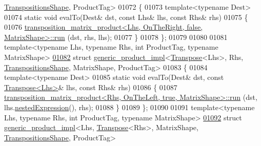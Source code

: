 \begin{DoxyCode}
      \hyperlink{struct_eigen_1_1_transpositions_shape}{TranspositionsShape}, ProductTag>
01072 \{
01073   \textcolor{keyword}{template}<\textcolor{keyword}{typename} Dest>
01074   \textcolor{keyword}{static} \textcolor{keywordtype}{void} evalTo(Dest& dst, \textcolor{keyword}{const} Lhs& lhs, \textcolor{keyword}{const} Rhs& rhs)
01075   \{
01076     \hyperlink{struct_eigen_1_1internal_1_1transposition__matrix__product}{transposition\_matrix\_product<Lhs, OnTheRight, false, MatrixShape>::run}
      (dst, rhs, lhs);
01077   \}
01078 \};
01079 
01080 
01081 \textcolor{keyword}{template}<\textcolor{keyword}{typename} Lhs, \textcolor{keyword}{typename} Rhs, \textcolor{keywordtype}{int} ProductTag, \textcolor{keyword}{typename} MatrixShape>
\hyperlink{struct_eigen_1_1internal_1_1generic__product__impl_3_01_transpose_3_01_lhs_01_4_00_01_rhs_00_01_287c8e613c7656c0ce6593799fd7b329}{01082} \textcolor{keyword}{struct }\hyperlink{struct_eigen_1_1internal_1_1generic__product__impl}{generic\_product\_impl}<\hyperlink{group___core___module_class_eigen_1_1_transpose}{Transpose}<Lhs>, Rhs, 
      \hyperlink{struct_eigen_1_1_transpositions_shape}{TranspositionsShape}, MatrixShape, ProductTag>
01083 \{
01084   \textcolor{keyword}{template}<\textcolor{keyword}{typename} Dest>
01085   \textcolor{keyword}{static} \textcolor{keywordtype}{void} evalTo(Dest& dst, \textcolor{keyword}{const} \hyperlink{group___core___module_class_eigen_1_1_transpose}{Transpose<Lhs>}& lhs, \textcolor{keyword}{const} Rhs& rhs)
01086   \{
01087     \hyperlink{struct_eigen_1_1internal_1_1transposition__matrix__product}{transposition\_matrix\_product<Rhs, OnTheLeft, true, MatrixShape>::run}
      (dst, lhs.\hyperlink{group___core___module_a72aefbf67f5e3caf62a99f73409b4a63}{nestedExpression}(), rhs);
01088   \}
01089 \};
01090 
01091 \textcolor{keyword}{template}<\textcolor{keyword}{typename} Lhs, \textcolor{keyword}{typename} Rhs, \textcolor{keywordtype}{int} ProductTag, \textcolor{keyword}{typename} MatrixShape>
\hyperlink{struct_eigen_1_1internal_1_1generic__product__impl_3_01_lhs_00_01_transpose_3_01_rhs_01_4_00_01_7e81e525eaa34bd7c41fa1e151593e72}{01092} \textcolor{keyword}{struct }\hyperlink{struct_eigen_1_1internal_1_1generic__product__impl}{generic\_product\_impl}<Lhs, \hyperlink{group___core___module_class_eigen_1_1_transpose}{Transpose}<Rhs>, MatrixShape, 
      \hyperlink{struct_eigen_1_1_transpositions_shape}{TranspositionsShape}, ProductTag>

\end{DoxyCode}
